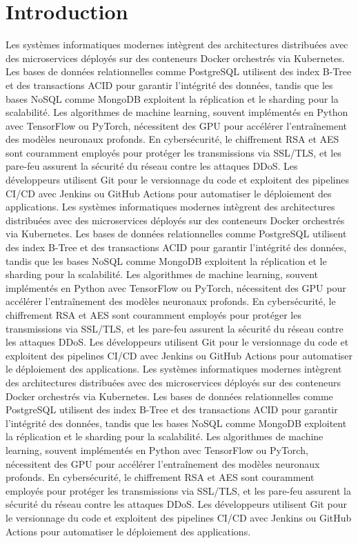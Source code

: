 
\chapter{Introduction}
\label{chapter:introduction}
Les systèmes informatiques modernes intègrent des architectures distribuées avec des microservices déployés sur des conteneurs Docker orchestrés via Kubernetes. Les bases de données relationnelles comme PostgreSQL utilisent des index B-Tree et des transactions ACID pour garantir l'intégrité des données, tandis que les bases NoSQL comme MongoDB exploitent la réplication et le sharding pour la scalabilité. Les algorithmes de machine learning, souvent implémentés en Python avec TensorFlow ou PyTorch, nécessitent des GPU pour accélérer l'entraînement des modèles neuronaux profonds. En cybersécurité, le chiffrement RSA et AES sont couramment employés pour protéger les transmissions via SSL/TLS, et les pare-feu assurent la sécurité du réseau contre les attaques DDoS. Les développeurs utilisent Git pour le versionnage du code et exploitent des pipelines CI/CD avec Jenkins ou GitHub Actions pour automatiser le déploiement des applications.
Les systèmes informatiques modernes intègrent des architectures distribuées avec des microservices déployés sur des conteneurs Docker orchestrés via Kubernetes. Les bases de données relationnelles comme PostgreSQL utilisent des index B-Tree et des transactions ACID pour garantir l'intégrité des données, tandis que les bases NoSQL comme MongoDB exploitent la réplication et le sharding pour la scalabilité. Les algorithmes de machine learning, souvent implémentés en Python avec TensorFlow ou PyTorch, nécessitent des GPU pour accélérer l'entraînement des modèles neuronaux profonds. En cybersécurité, le chiffrement RSA et AES sont couramment employés pour protéger les transmissions via SSL/TLS, et les pare-feu assurent la sécurité du réseau contre les attaques DDoS. Les développeurs utilisent Git pour le versionnage du code et exploitent des pipelines CI/CD avec Jenkins ou GitHub Actions pour automatiser le déploiement des applications.
Les systèmes informatiques modernes intègrent des architectures distribuées avec des microservices déployés sur des conteneurs Docker orchestrés via Kubernetes. Les bases de données relationnelles comme PostgreSQL utilisent des index B-Tree et des transactions ACID pour garantir l'intégrité des données, tandis que les bases NoSQL comme MongoDB exploitent la réplication et le sharding pour la scalabilité. Les algorithmes de machine learning, souvent implémentés en Python avec TensorFlow ou PyTorch, nécessitent des GPU pour accélérer l'entraînement des modèles neuronaux profonds. En cybersécurité, le chiffrement RSA et AES sont couramment employés pour protéger les transmissions via SSL/TLS, et les pare-feu assurent la sécurité du réseau contre les attaques DDoS. Les développeurs utilisent Git pour le versionnage du code et exploitent des pipelines CI/CD avec Jenkins ou GitHub Actions pour automatiser le déploiement des applications.
